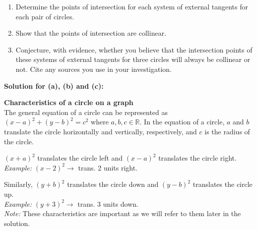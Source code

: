 \documentclass[12pt]{book}
\begin{document}
\begin{enumerate}
\begin{enumerate}
\item Determine the points of intersection for each system of external tangents for each pair of circles.
\item Show that the points of intersection are collinear.
\item Conjecture, with evidence, whether you believe that the intersection points of these systems of external tangents for three circles will always be collinear or not. Cite any sources you use in your investigation.
\end{enumerate}
 %

\textbf{Solution for (a), (b) and (c):}

\textbf{Characteristics of a circle on a graph}\\
The general equation of a circle can be represented as $(x-a)^2+(y-b)^2 = c^2$ where $a,b,c \in \mathbb{R}$. In the equation of a circle, $a$ and $b$ translate the circle horizontally and vertically, respectively, and $c$ is the radius of the circle.

$(x+a)^2$ translates the circle left and $(x-a)^2$ translates the circle right.\\
\textit{Example:} $(x-2)^2 \xrightarrow{}$ trans. 2 units right.

Similarly, $(y+b)^2$ translates the circle down and $(y-b)^2$ translates the circle up.\\
\textit{Example:} $(y+3)^2 \xrightarrow{}$ trans. 3 units down.\\
\textit{Note:} These characteristics are important as we will refer to them later in the solution.


\end{enumerate}
\end{document}

